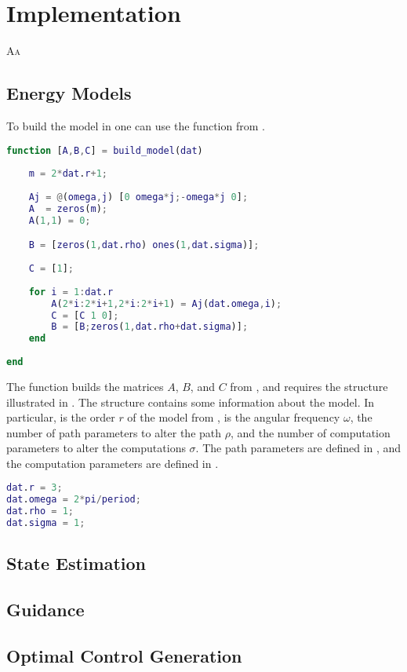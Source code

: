 
\chapter{\color{red}Implementation}
\label{app:imp}

\lettrine{A}{a}


\section{\color{cyan}Energy Models}

To build the model in \matlab one can use the function  from .

\begin{lstlisting}[language=Matlab,caption={Function \stt{build\_model} that creates the energy model.},captionpos=b,label=lst:build_model]
function [A,B,C] = build_model(dat)
    
    m = 2*dat.r+1;
    
    Aj = @(omega,j) [0 omega*j;-omega*j 0];
    A  = zeros(m);
    A(1,1) = 0;

    B = [zeros(1,dat.rho) ones(1,dat.sigma)];
        
    C = [1];
    
    for i = 1:dat.r
        A(2*i:2*i+1,2*i:2*i+1) = Aj(dat.omega,i); 
        C = [C 1 0];
        B = [B;zeros(1,dat.rho+dat.sigma)];
    end
    
end
\end{lstlisting}

The function builds the matrices $A$, $B$, and $C$ from , and requires the structure  illustrated in . The structure contains some information about the model. In particular,  is the order $r$ of the model from ,  is the angular frequency $\omega$,  the number of path parameters to alter the path $\rho$, and  the number of computation parameters to alter the computations $\sigma$. The path parameters are defined in , and the computation parameters are defined in .

\begin{lstlisting}[language=Matlab,caption={Struct \stt{dat} used by function \stt{build\_model} to build the model.},captionpos=b,label=lst:struct_dat]
dat.r = 3;
dat.omega = 2*pi/period;
dat.rho = 1;
dat.sigma = 1;
\end{lstlisting}


\section{\color{red}State Estimation}


\section{\color{red}Guidance}


\section{\color{red}Optimal Control Generation}



